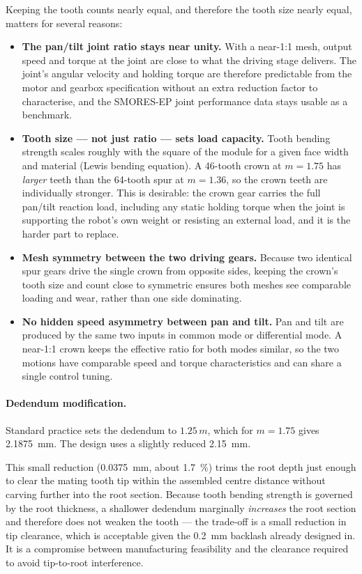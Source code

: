 \documentclass[12pt,a4paper]{article}
\begin{document}
Keeping the tooth counts nearly equal, and therefore the tooth size nearly
equal, matters for several reasons:
\begin{itemize}
	\item \textbf{The pan/tilt joint ratio stays near unity.} With a near-1:1
	      mesh, output speed and torque at the joint are close to what the
	      driving stage delivers. The joint's angular velocity and holding
	      torque are therefore predictable from the motor and gearbox
	      specification without an extra reduction factor to characterise, and
	      the SMORES-EP joint performance data stays usable as a benchmark.
	\item \textbf{Tooth size --- not just ratio --- sets load capacity.} Tooth
	      bending strength scales roughly with the square of the module for a
	      given face width and material (Lewis bending equation). A 46-tooth
	      crown at $m = 1.75$ has \emph{larger} teeth than the 64-tooth spur at
	      $m = 1.36$, so the crown teeth are individually stronger. This is
	      desirable: the crown gear carries the full pan/tilt reaction load,
	      including any static holding torque when the joint is supporting the
	      robot's own weight or resisting an external load, and it is the harder
	      part to replace.
	\item \textbf{Mesh symmetry between the two driving gears.} Because two
	      identical spur gears drive the single crown from opposite sides,
	      keeping the crown's tooth size and count close to symmetric ensures
	      both meshes see comparable loading and wear, rather than one side
	      dominating.
	\item \textbf{No hidden speed asymmetry between pan and tilt.} Pan and tilt
	      are produced by the same two inputs in common mode or differential
	      mode. A near-1:1 crown keeps the effective ratio for both modes
	      similar, so the two motions have comparable speed and torque
	      characteristics and can share a single control tuning.
\end{itemize}

\paragraph{Dedendum modification.}
Standard practice sets the dedendum to $1.25\,m$, which for $m = 1.75$ gives
\SI{2.1875}{\milli\metre}. The design uses a slightly reduced
\SI{2.15}{\milli\metre}.

This small reduction (\SI{0.0375}{\milli\metre}, about \SI{1.7}{\percent}) trims
the root depth just enough to clear the mating tooth tip within the assembled
centre distance without carving further into the root section. Because tooth
bending strength is governed by the root thickness, a shallower dedendum
marginally \emph{increases} the root section and therefore does not weaken the
tooth --- the trade-off is a small reduction in tip clearance, which is
acceptable given the \SI{0.2}{\milli\metre} backlash already designed in. It is
a compromise between manufacturing feasibility and the clearance required to
avoid tip-to-root interference.
\end{document}
